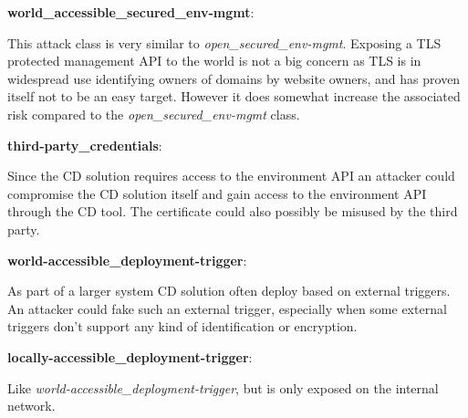\textbf{world\_accessible\_secured\_env-mgmt}: \begin{displayquote}
This attack class is very similar to \textit{open\_secured\_env-mgmt}. Exposing a TLS protected management API to the world is not a big concern as TLS is in widespread use identifying owners of domains by website owners\cite{sslpulse}, and has proven itself not to be an easy target. However it does somewhat increase the associated risk compared to the \textit{open\_secured\_env-mgmt} class.
\end{displayquote}

\textbf{third-party\_credentials}: \begin{displayquote}
Since the CD solution requires access to the environment API an attacker could compromise the CD solution itself and gain access to the environment API through the CD tool. The certificate could also possibly be misused by the third party.
\end{displayquote}

\textbf{world-accessible\_deployment-trigger}: \begin{displayquote}
As part of a larger system CD solution often deploy based on external triggers. An attacker could fake such an external trigger, especially when some external triggers don't support any kind of identification or encryption.\cite{docker-no-id}
\end{displayquote}

\textbf{locally-accessible\_deployment-trigger}: \begin{displayquote}
Like \textit{world-accessible\_deployment-trigger}, but is only exposed on the internal network. 
\end{displayquote}